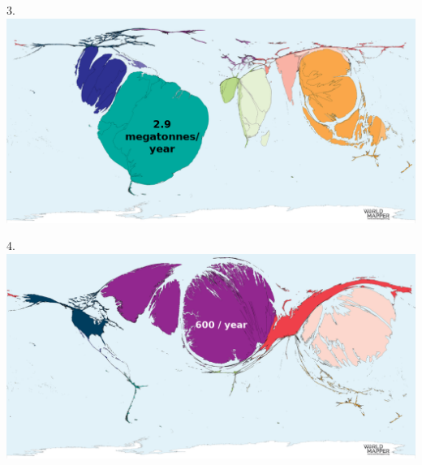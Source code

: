 \begin{frame}
\begin{center}
\Large
3. 
\\
\vspace{0.5em}\includegraphics[height=0.6\paperheight]{maps/picture_3.png}
\\
\end{center}
\end{frame}
\begin{frame}
\begin{center}
\Large
4. 
\\
\vspace{0.5em}\includegraphics[height=0.6\paperheight]{maps/picture_4.png}
\\
\end{center}
\end{frame}
